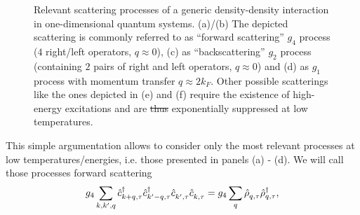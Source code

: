 \documentclass{svmono}
\def\pdag{{\vphantom\dag}}
\providecommand{\DIFdeltex}[1]{{\protect\color{red}\sout{#1}}}                      %
\providecommand{\DIFdelFL}[1]{\DIFdel{#1}} %
\providecommand{\DIFdelbeginFL}{} %
\providecommand{\DIFdelendFL}{} %
\providecommand{\DIFdel}[1]{\texorpdfstring{\DIFdeltex{#1}}{}} %
\newcommand{\DIFscaledelfig}{0.5}
\newlength{\DIFdelgraphicswidth} %
\newlength{\DIFdelgraphicsheight} %
\newcommand{\DIFdelincludegraphics}[2][]{%
\sbox{\DIFdelgraphicsbox}{\DIFOincludegraphics[#1]{#2}}%
\settoboxwidth{\DIFdelgraphicswidth}{\DIFdelgraphicsbox} %
\settoboxtotalheight{\DIFdelgraphicsheight}{\DIFdelgraphicsbox} %
\scalebox{\DIFscaledelfig}{%
\parbox[b]{\DIFdelgraphicswidth}{\usebox{\DIFdelgraphicsbox}\\[-\baselineskip] \rule{\DIFdelgraphicswidth}{0em}}\llap{\resizebox{\DIFdelgraphicswidth}{\DIFdelgraphicsheight}{%
\setlength{\unitlength}{\DIFdelgraphicswidth}%
\begin{picture}(1,1)%
\thicklines\linethickness{2pt} %
{\color[rgb]{1,0,0}\put(0,0){\framebox(1,1){}}}%
{\color[rgb]{1,0,0}\put(0,0){\line( 1,1){1}}}%
{\color[rgb]{1,0,0}\put(0,1){\line(1,-1){1}}}%
\end{picture}%
}\hspace*{3pt}}} %
} %
\DeclareRobustCommand{\DIFdelbeginFL}{\DIFOdelbeginFL \let\includegraphics\DIFdelincludegraphics} %
\DeclareRobustCommand{\DIFdelendFL}{\DIFOaddendFL \let\includegraphics\DIFOincludegraphics} %
\begin{document}
\begin{figure}
    \caption{Relevant scattering processes of a generic density-density interaction in one-dimensional quantum systems. (a)/(b) The depicted scattering is commonly referred to as ``forward scattering'' $g_4$ process ($4$ right/left operators, $q\approx0$), (c) as ``backscattering'' $g_2$ process (containing $2$ pairs of right and left operators, $q\approx0$) and (d) as $g_1$ process with momentum transfer $q\approx 2k_F$. Other possible scatterings like the ones depicted in (e) and (f) require the existence of high-energy excitations and are \DIFdelbeginFL \DIFdelFL{thus }\DIFdelendFL exponentially suppressed at low temperatures.}
    \label{fig:scattering_processes}
\end{figure}
This simple argumentation allows to consider only the most relevant processes at low temperatures/energies, i.e. those presented in panels (a) - (d).
We will call those processes forward scattering
\begin{align}
    g_4\sum_{k,k',q}\hat c^\dag_{k+q,\tau}\hat c^\dag_{k'-q,\tau}\hat c^\pdag_{k',\tau}\hat c^\pdag_{k,\tau} = g_4 \sum_q\hat\rho^\pdag_{q,\tau}\hat\rho^\dag_{q,\tau},
\end{align}
\end{document}
